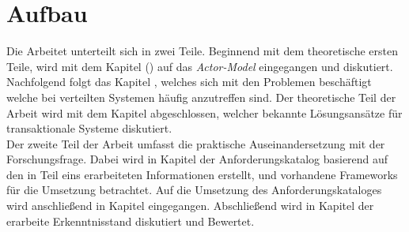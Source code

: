 \section{Aufbau}
Die Arbeitet unterteilt sich in zwei Teile. Beginnend mit dem theoretische ersten Teile, wird mit dem Kapitel  () auf das \textit{Actor-Model} eingegangen und diskutiert. Nachfolgend folgt das Kapitel , welches sich mit den Problemen beschäftigt welche bei verteilten Systemen häufig anzutreffen sind. Der theoretische Teil der Arbeit wird mit dem Kapitel  abgeschlossen, welcher bekannte Lösungsansätze für transaktionale Systeme diskutiert. \\
Der zweite Teil der Arbeit umfasst die praktische Auseinandersetzung mit der Forschungsfrage. Dabei wird in Kapitel  der Anforderungskatalog basierend auf den in Teil eins erarbeiteten Informationen erstellt, und vorhandene Frameworks für die Umsetzung betrachtet. Auf die Umsetzung des Anforderungskataloges wird anschließend in Kapitel  eingegangen. Abschließend wird in Kapitel  der erarbeite Erkenntnisstand diskutiert und Bewertet.  